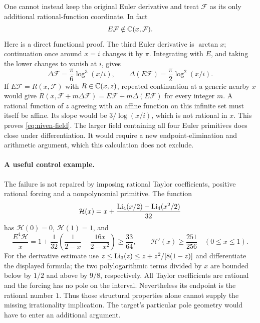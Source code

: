 One cannot instead keep the original Euler derivative and treat
$\mathcal F$ as its only additional rational-function coordinate.
In fact
\begin{equation}\label{eq:niven-field}
 E\mathcal F\notin\mathbb C(x,\mathcal F).
\end{equation}
Here is a direct functional proof. The third Euler derivative is
$\arctan x$; continuation once around $x=i$ changes it by $\pi$.
Integrating with $E$, and taking the lower changes to vanish at $i$,
gives
\[
 \Delta\mathcal F=\frac\pi6\log^3(x/i),\qquad
 \Delta(E\mathcal F)=\frac\pi2\log^2(x/i).
\]
If $E\mathcal F=R(x,\mathcal F)$ with $R\in\mathbb C(x,z)$, repeated
continuation at a generic nearby $x$ would give
$R(x,\mathcal F+m\Delta\mathcal F)
 =E\mathcal F+m\Delta(E\mathcal F)$ for every integer $m$.
A rational function of $z$ agreeing with an affine function on this
infinite set must itself be affine. Its slope would be
$3/\log(x/i)$, which is not rational in $x$. This proves
\eqref{eq:niven-field}. The larger field containing all four Euler
primitives does close under differentiation. It would require a new
endpoint-elimination and arithmetic argument, which this calculation
does not exclude.

\paragraph{A useful control example.}
The failure is not repaired by imposing rational Taylor coefficients,
positive rational forcing and a nonpolynomial primitive. The function
\[
 \mathcal H(x)=x+\frac{\operatorname{Li}_4(x/2)-\operatorname{Li}_4(x^2/2)}{32}
\]
has $\mathcal H(0)=0$, $\mathcal H(1)=1$, and
\[
 \frac{E^4\mathcal H}{x}
    =1+\frac1{32}\left(\frac1{2-x}-\frac{16x}{2-x^2}\right)
       \geq\frac{33}{64},\qquad
 \mathcal H'(x)\geq\frac{251}{256}\quad(0\leq x\leq1).
\]
For the derivative estimate use
$z\leq\operatorname{Li}_3(z)\leq z+z^2/[8(1-z)]$ and differentiate the displayed
formula; the two polylogarithmic terms divided by $x$ are bounded
below by $1/2$ and above by $9/8$, respectively. All Taylor
coefficients are rational and the forcing has no pole on the interval.
Nevertheless its endpoint is the rational number $1$.
Thus those structural properties alone cannot supply the missing
irrationality implication. The target's particular pole geometry
would have to enter an additional argument.
